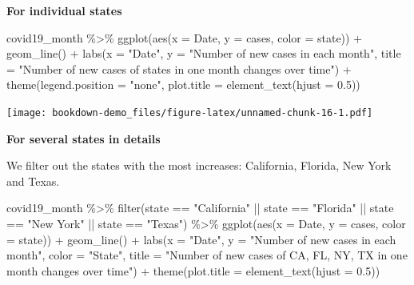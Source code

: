 \documentclass[
]{book}
\newenvironment{Shaded}{\begin{snugshade}}{\end{snugshade}}
\newcommand{\AttributeTok}[1]{\textcolor[rgb]{0.77,0.63,0.00}{#1}}
\newcommand{\FloatTok}[1]{\textcolor[rgb]{0.00,0.00,0.81}{#1}}
\newcommand{\FunctionTok}[1]{\textcolor[rgb]{0.00,0.00,0.00}{#1}}
\newcommand{\NormalTok}[1]{#1}
\newcommand{\SpecialCharTok}[1]{\textcolor[rgb]{0.00,0.00,0.00}{#1}}
\newcommand{\StringTok}[1]{\textcolor[rgb]{0.31,0.60,0.02}{#1}}
\begin{document}
\textbf{For individual states}

\begin{Shaded}
\begin{Highlighting}[]
\NormalTok{covid19\_month }\SpecialCharTok{\%\textgreater{}\%}
  \FunctionTok{ggplot}\NormalTok{(}\FunctionTok{aes}\NormalTok{(}\AttributeTok{x =}\NormalTok{ Date, }\AttributeTok{y =}\NormalTok{ cases, }\AttributeTok{color =}\NormalTok{ state)) }\SpecialCharTok{+}
  \FunctionTok{geom\_line}\NormalTok{() }\SpecialCharTok{+} 
  \FunctionTok{labs}\NormalTok{(}\AttributeTok{x =} \StringTok{"Date"}\NormalTok{, }\AttributeTok{y =} \StringTok{"Number of new cases in each month"}\NormalTok{, }\AttributeTok{title =} \StringTok{"Number of new cases of states in one month changes over time"}\NormalTok{) }\SpecialCharTok{+}
  \FunctionTok{theme}\NormalTok{(}\AttributeTok{legend.position =} \StringTok{"none"}\NormalTok{, }\AttributeTok{plot.title =} \FunctionTok{element\_text}\NormalTok{(}\AttributeTok{hjust =} \FloatTok{0.5}\NormalTok{))}
\end{Highlighting}
\end{Shaded}

\texttt{[image: bookdown-demo\_files/figure-latex/unnamed-chunk-16-1.pdf]}

\textbf{For several states in details}

We filter out the states with the most increases: California, Florida, New York and Texas.

\begin{Shaded}
\begin{Highlighting}[]
\NormalTok{covid19\_month }\SpecialCharTok{\%\textgreater{}\%}
  \FunctionTok{filter}\NormalTok{(state }\SpecialCharTok{==} \StringTok{"California"} \SpecialCharTok{||}\NormalTok{ state }\SpecialCharTok{==} \StringTok{"Florida"} \SpecialCharTok{||}\NormalTok{ state }\SpecialCharTok{==} \StringTok{"New York"} \SpecialCharTok{||}\NormalTok{ state }\SpecialCharTok{==} \StringTok{"Texas"}\NormalTok{) }\SpecialCharTok{\%\textgreater{}\%}
  \FunctionTok{ggplot}\NormalTok{(}\FunctionTok{aes}\NormalTok{(}\AttributeTok{x =}\NormalTok{ Date, }\AttributeTok{y =}\NormalTok{ cases, }\AttributeTok{color =}\NormalTok{ state)) }\SpecialCharTok{+}
  \FunctionTok{geom\_line}\NormalTok{() }\SpecialCharTok{+}
  \FunctionTok{labs}\NormalTok{(}\AttributeTok{x =} \StringTok{"Date"}\NormalTok{, }\AttributeTok{y =} \StringTok{"Number of new cases in each month"}\NormalTok{, }\AttributeTok{color =} \StringTok{"State"}\NormalTok{, }\AttributeTok{title =} \StringTok{"Number of new cases of CA, FL, NY, TX in one month changes over time"}\NormalTok{) }\SpecialCharTok{+}
  \FunctionTok{theme}\NormalTok{(}\AttributeTok{plot.title =} \FunctionTok{element\_text}\NormalTok{(}\AttributeTok{hjust =} \FloatTok{0.5}\NormalTok{))}
\end{Highlighting}
\end{Shaded}
\end{document}
